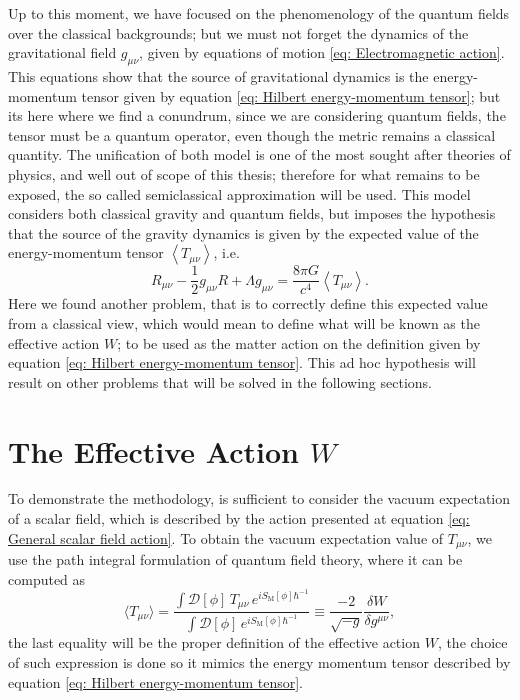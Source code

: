 Up to this moment, we have focused on the phenomenology of the quantum fields over the classical backgrounds; but we must not forget the dynamics of the gravitational field $g_{\mu\nu}$, given by equations of motion \ref{eq: Electromagnetic action}. This equations show that the source of gravitational dynamics is the energy-momentum tensor given by equation \ref{eq: Hilbert energy-momentum tensor}; but its here where we find a conundrum, since we are considering quantum fields, the tensor must be a quantum operator, even though the metric remains a classical quantity. The unification of both model is one of the most sought after theories of physics, and well out of scope of this thesis; therefore for what remains to be exposed, the so called semiclassical approximation will be used. This model considers both classical gravity and quantum fields, but imposes the hypothesis that the source of the gravity dynamics is given by the expected value of the energy-momentum tensor $\left\langle T_{\mu\nu}\right\rangle$, i.e.
\begin{equation}
	R_{\mu\nu}-\frac{1}{2}g_{\mu\nu}R+\Lambda g_{\mu\nu}=\frac{8\pi G}{c^4}\left\langle T_{\mu\nu}\right\rangle.
\end{equation}
Here we found another problem, that is to correctly define this expected value from a classical view, which would mean to define what will be known as the effective action $W$; to be used as the matter action on the definition given by equation \ref{eq: Hilbert energy-momentum tensor}. This ad hoc hypothesis will result on other problems that will be solved  in the following sections.
\section{The Effective Action $W$}
To demonstrate the methodology, is sufficient to consider the vacuum expectation of a scalar field, which is described by the action presented at equation \ref{eq: General scalar field action}. To obtain the vacuum expectation value of $T_{\mu\nu}$, we use the path integral formulation of quantum field theory, where it can be computed as
\begin{equation}\label{eq: General effective action definition}
	\langle T_{\mu\nu}\rangle =\frac{\int \mathcal{D}[\phi]\,T_{\mu\nu}\,e^{iS_\text{M}[\phi]\hbar^{-1}}}{\int \mathcal{D}[\phi]\,e^{iS_\text{M}[\phi]\hbar^{-1}}}\equiv \frac{-2}{\sqrt{-g}}\frac{\delta W}{\delta g^{\mu\nu}},
\end{equation}
the last equality will be the proper definition of the effective action $W$, the choice of such expression is done so it mimics the energy momentum tensor described by equation \ref{eq: Hilbert energy-momentum tensor}.

